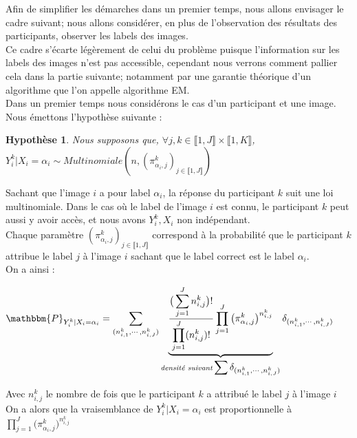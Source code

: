 \documentclass[frenchb]{report}
\newcommand{\1}{\mathbbm{1}}
\newcommand{\prob}{\mathbbm{P}}
\newtheorem{hyp}{Hypothèse}
\theoremstyle{definition}\newtheorem{defn}{Définition}
\theoremstyle{definition}\newtheorem{exm}{Exemple}
\theoremstyle{definition}\newtheorem{nota}{Notation}
\theoremstyle{definition}\newtheorem{rem}{Remarque}
\begin{document}
Afin de simplifier les démarches dans un premier temps, nous allons envisager le cadre suivant; nous allons considérer, en plus de l'observation des résultats des participants, observer les labels des images. \\
Ce cadre s'écarte légèrement de celui du problème puisque l'information sur les labels des images n'est pas accessible, cependant nous verrons comment pallier cela dans la partie suivante; notamment par une garantie théorique d'un algorithme que l'on appelle algorithme EM. \\
Dans un premier temps nous considérons le cas d'un participant et une image.\\

Nous émettons l'hypothèse suivante : 

\begin{hyp}
	Nous supposons que, $\forall j,k \in \llbracket 1,J \rrbracket \times \llbracket 1,K \rrbracket$, $Y^k_i | X_i = \alpha_i \sim Multinomiale(n,(\pi^k_{\alpha_i,j})_{j \in \llbracket 1,J \rrbracket})$
\end{hyp}

Sachant que l'image $i$ a pour label $\alpha_i$, la réponse du participant $k$ suit une loi multinomiale. Dans le cas où le label de l'image $i$ est connu, le participant $k$ peut aussi y avoir accès, et nous avons $Y^k_i, X_i $ non indépendant. \\

Chaque paramètre $(\pi^k_{\alpha_i,j})_{j \in \llbracket 1,J \rrbracket}$ correspond à la probabilité que le participant $k$  attribue le label $j$ à l'image $i$ sachant que le label correct est le label $\alpha_i$.\\

\newpage
On a ainsi :

\begin{center}
$\prob_{Y^k_i|X_i = \alpha_i} = \displaystyle \sum_{(n^k_{i,1}, \cdots, n^k_{i,J})} \underbrace{\frac{\big(\displaystyle \sum_{j=1}^J n^k_{i,j}\big)!}{\displaystyle \prod_{j=1}^J (n^k_{i,j})!}\displaystyle \prod_{j=1}^J \big(\pi^k_{\alpha_i,j}\big)^{n^k_{i,j}}}_{\textit{densité suivant} \displaystyle \sum \delta_{(n^k_{i,1}, \cdots, n^k_{i,J})}} \delta_{(n^k_{i,1}, \cdots, n^k_{i,J})}$
\end{center}

Avec $n^k_{i,j}$ le nombre de fois que le participant $k$ a attribué le label $j$ à l'image $i$\\

On a alors que la vraisemblance de $Y^k_i | X_i = \alpha_i$ est proportionnelle à $\displaystyle \prod_{j=1}^J \big(\pi^k_{\alpha_i,j}\big)^{n^k_{i,j}}$\\
\end{document}
